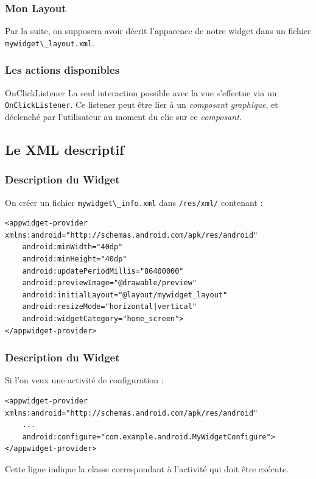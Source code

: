 \documentclass{beamer}
\begin{document}
\begin{frame}
\frametitle{Mon Layout}
Par la suite, on supposera avoir décrit l'apparence de notre widget dans un fichier \verb!mywidget\_layout.xml!.
\end{frame}


\begin{frame}
\frametitle{Les actions disponibles}
\begin{block}{OnClickListener}
La seul interaction possible avec la vue s'effectue via un \verb!OnClickListener!. Ce listener peut être lier à un \emph{composant graphique}, et déclenché par l'utilisateur au moment du clic sur ce \emph{composant}.
\end{block}
\end{frame}

\subsection{Le XML descriptif}

\begin{frame}[fragile]
\frametitle{Description du Widget}

\begin{exampleblock}{On créer un fichier \verb!mywidget\_info.xml! dans \verb!/res/xml/! contenant : }
\lstset{language=xml}
\begin{lstlisting}
<appwidget-provider xmlns:android="http://schemas.android.com/apk/res/android"
    android:minWidth="40dp"
    android:minHeight="40dp"
    android:updatePeriodMillis="86400000"
    android:previewImage="@drawable/preview"
    android:initialLayout="@layout/mywidget_layout"
    android:resizeMode="horizontal|vertical"
    android:widgetCategory="home_screen">
</appwidget-provider>
\end{lstlisting}
\end{exampleblock}
\end{frame}

\begin{frame}[fragile]
\frametitle{Description du Widget}

\begin{exampleblock}{Si l'on veux une activité de configuration : }
\lstset{language=xml}
\begin{lstlisting}
<appwidget-provider xmlns:android="http://schemas.android.com/apk/res/android"
    ...
    android:configure="com.example.android.MyWidgetConfigure">
</appwidget-provider>
\end{lstlisting}
\end{exampleblock}

\begin{block}{}
Cette ligne indique la classe correspondant à l'activité qui doit être exécute.
\end{block}
\end{frame}
\end{document}
